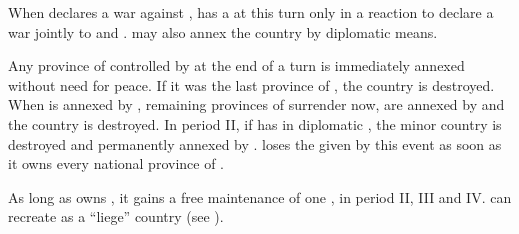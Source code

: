 \phdipl
\aparag When \SPA declares a war against \paysNaples, \FRA has a \CB at this
turn only in a reaction to declare a war jointly to \SPA and \paysNaples.
\aparag \SPA may also annex the country by diplomatic means.

\phpaix
\aparag Any province of \paysNaples controlled by \SPA at the end of a turn is
immediately annexed without need for peace. If it was the last province of
\paysNaples, the country is destroyed. When \villeNaples is annexed by \SPA,
remaining provinces of \paysNaples surrender now, are annexed by \SPA and the
country is destroyed.
\aparag In period II, if \SPA has \paysNaples in diplomatic \ANNEXION, the
minor country is destroyed and permanently annexed by \SPA.
\aparag \SPA loses the \CB given by this event as soon as it owns every
national province of \paysNaples.

\effetlong
\aparag As long as \SPA owns \provinceCampania, it gains a free maintenance of
one \FLEET\facemoins, in period II, III and IV.
\aparag \SPA can recreate \paysNaples as a ``liege'' country (see
).


